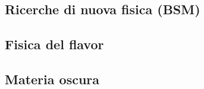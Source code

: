 \subsection{Ricerche di nuova fisica (BSM)}



\begin{comment}
In Belle II è possibile ricercare modelli di nuova fisica che includono specifici accoppiamenti di flavor, la cui ricerca indiretta potrebbe spingere la scala di energia di nuovi meccanismi a livelli anche più alti rispetto alla ricerca diretta, suggerendo inoltre, in quale direzione muoversi per scoprire eventuali nuovi processi. 

Un'importante transizione molto studiata in Belle II è \textit{b}$\rightarrow$\textit{s}. 
Inizialmente la misura di violazione di CP nei sistemi $B_{d}$ è stata fatta usando transizioni a tre livelli del tipo \textit{b}$\rightarrow$\textit{c\bar{c}s}, ad esempio nel golden channel B$\rightarrow$ J/$\psi$$K_{S}^{0}$. Successivamente si è cominciato ad osservare la violazione di CP anche nelle transizioni a loop indotto(??) \textit{b}$\rightarrow$\textit{s}, come B$\rightarrow$ $\phi$$K_{S}^{0}$ oppure B$\rightarrow$ $\eta'$$K_{S}^{0}$. Anche se l'attuale precisione possibile in questi canali, non raggiunge quella dei precedenti.

Nello MS la violazione di CP attesa in queste transizioni è abbastanza piccola, quindi qualsiasi osservazioni significativa potrebbe essere segnale di nuova fisica. 

Un ulteriore indizio di nuova fisica, è stato trovato negli anni passati nella misura del Branching-ratio di B$\rightarrow$ $\nu\tau$, che è una annichilazione a tre livelli del tipo \textit{b}$\rightarrow$\textit{u} e il cui stato finale include almeno due neutrini, per cui una sfida impegnativa dal punto di vista sperimentale.
\end{comment}

\subsection{Fisica del flavor}

\subsection{Materia oscura}





